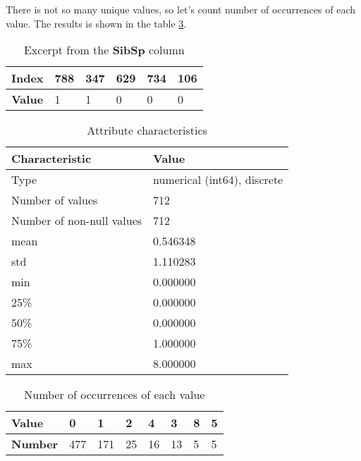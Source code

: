 There is not so many unique values, so let's count number of occurrences 
of each value. The results is shown in the table \ref{table:sibsp_value_counts}.

\begin{table}[!ht]
    \centering
    \caption{Excerpt from the \textbf{SibSp} column}
    \begin{tabular}{|l|l|l|l|l|l|}
        \hline
        \textbf{Index} & 788 & 347 & 629 & 734 & 106 \\ \hline
        \textbf{Value} & 1   & 1   & 0   & 0   & 0   \\ \hline
    \end{tabular}
    \label{table:sibsp_head}
\end{table}

\begin{table}[!ht]
    \centering
    \caption{Attribute characteristics}
    \begin{tabular}{|l|l|}
        \hline
        \textbf{Characteristic}   & \textbf{Value}              \\ \hline
        Type                      & numerical (int64), discrete \\ \hline
        Number of values          & 712                         \\ \hline
        Number of non-null values & 712                         \\ \hline
        mean                      & 0.546348                    \\ \hline
        std                       & 1.110283                    \\ \hline
        min                       & 0.000000                    \\ \hline
        25\%                      & 0.000000                    \\ \hline
        50\%                      & 0.000000                    \\ \hline
        75\%                      & 1.000000                    \\ \hline
        max                       & 8.000000                    \\ \hline
    \end{tabular}
    \label{table:sibsp_characteristics}
\end{table}

\begin{table}[!ht]
    \centering
    \caption{Number of occurrences of each value}
    \begin{tabular}{|l|l|l|l|l|l|l|l|}
        \hline
        \textbf{Value}  & 0   & 1   & 2  & 4  & 3  & 8 & 5 \\ \hline
        \textbf{Number} & 477 & 171 & 25 & 16 & 13 & 5 & 5 \\ \hline
    \end{tabular}
    \label{table:sibsp_value_counts}
\end{table}

